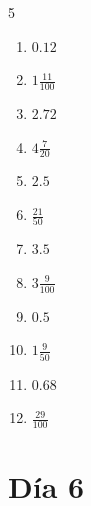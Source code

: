 \documentclass[12pt]{article}
\begin{document}
\begin{multicols}{5}
\begin{enumerate}
		\item $ 0.12 $
		\item $ 1 \frac{11}{100} $
		\item $ 2.72 $
		\item $ 4 \frac{7}{20} $
		\item $ 2.5 $
		\item $ \frac{21}{50} $
		\item $ 3.5 $
		\item $ 3 \frac{9}{100} $
		\item $ 0.5 $
		\item $ 1 \frac{9}{50} $
		\item $ 0.68 $
		\item $ \frac{29}{100} $
	\end{enumerate}\end{multicols}\newpage
\section*{Día 6}
\end{document}

